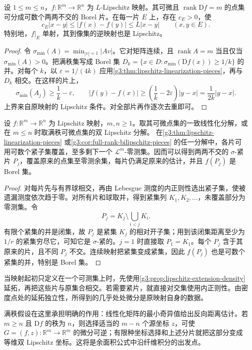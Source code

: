 \begin{corollary}\label{g3:cor:full-rank-bilipschitz-pieces}
	设 \(1\le m\le n\)，\(f:\mathbb R^m\to\mathbb R^n\) 为 \(L\)-Lipschitz 映射。其可微且 \(\operatorname{rank}\mathrm Df=m\) 的点集可分成可数个两两不交的 Borel 片。在每一片 \(E\) 上，存在 \(c_E>0\)，使
	\[
		c_E|x-y|\le|f(x)-f(y)|\le L|x-y|
		\qquad(x,y\in E).
	\]
	特别地，\(f|_E\) 单射，其到像集的逆映射也是 Lipschitz。
\end{corollary}
\begin{proof}
	令 \(\sigma_{\min}(A)=\min_{|v|=1}|Av|\)。它对矩阵连续，且 \(\operatorname{rank}A=m\) 当且仅当 \(\sigma_{\min}(A)>0\)。把满秩集写成 Borel 集
	\(D_k=\{x\in D:\sigma_{\min}(\mathrm Df(x))\ge1/k\}\) 的并。对每个 \(k\)，以 \(\varepsilon=1/(4k)\) 应用\cref{g3:thm:lipschitz-linearization-pieces}，再与 \(D_k\) 相交。在这样的片上，
	\[
		\sigma_{\min}(A_j)\ge\frac1k-\varepsilon,
		\qquad
		|f(y)-f(x)|\ge\left(\frac1k-2\varepsilon\right)|y-x|
		=\frac1{2k}|y-x|.
	\]
	上界来自原映射的 Lipschitz 条件。对全部片再作逐次去重即可。
\end{proof}

\begin{corollary}\label{g3:cor:compact-linearization-pieces}
	设 \(f:\mathbb R^m\to\mathbb R^n\) 为 Lipschitz 映射，\(m,n\ge1\)。取其可微点集的一致线性化分解，或在 \(m\le n\) 时取满秩可微点集的双 Lipschitz 分解。
	在\cref{g3:thm:lipschitz-linearization-pieces} 或\cref{g3:cor:full-rank-bilipschitz-pieces} 的任一分解中，各片可用可数个紧子集覆盖，至多剩下一个 \(\mathcal L^m\)-零测集。因而可以得到两两不交的 \(\sigma\)-紧片 \(P_j\)，覆盖原来的点集至零测余集，每片仍满足原来的估计，并且 \(f(P_j)\) 是 Borel 集。
\end{corollary}
\begin{proof}
	对每片先与有界球相交，再由 Lebesgue 测度的内正则性选出紧子集，使被遗漏测度依次趋于零。对所有片和球取并，得到紧集列 \(K_1,K_2,\ldots\)，未覆盖部分为零测集。令
	\[
		P_j=K_j\setminus\bigcup_{i<j}K_i.
	\]
	有限个紧集的并是闭集，故 \(P_j\) 是紧集 \(K_j\) 的相对开子集；用到该闭集距离至少为 \(1/r\) 的紧集穷尽它，可知它是 \(\sigma\)-紧的。\(j=1\) 时直接取 \(P_1=K_1\)。每个 \(P_j\) 含于其原来的片，且不同 \(P_j\) 不交。连续映射把紧集变成紧集，因此 \(f(P_j)\) 也是可数个紧集的并，特别是 Borel 集。
\end{proof}

当映射起初只定义在一个可测集上时，先使用\cref{g3:prop:lipschitz-extension-density} 延拓，再把这些片与原集合相交。若需要紧片，就直接对交集使用内正则性。由密度点处的延拓独立性，所得到的几乎处处微分是原映射自身的数据。

\ProseParagraphBreak
满秩假设在这里承担明确的作用：线性化矩阵的最小奇异值给出反向距离估计。若 \(m\ge n\) 且 \(\mathrm Df\) 的秩为 \(n\)，则选择适当的 \(m-n\) 个源坐标 \(z\)，可使 \(G=(f,z):\mathbb R^m\to\mathbb R^m\) 的微分可逆；有限种坐标选择和上述分片就把这部分变成等维双 Lipschitz 坐标。这将是余面积公式中沿纤维积分的出发点。

